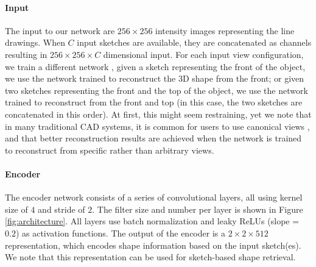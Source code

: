 \documentclass[10pt, conference, compsocconf]{IEEEtran}
\begin{document}
\vspace{-1mm}\paragraph{Input} The input to our network are $256 \times 256$ intensity images representing the line drawings. When $C$ input sketches are available, they are concatenated as channels resulting in $256 \times 256 \times C$ dimensional input. For each input view configuration, we train a different network \ie, given a sketch representing the front of the object, we use the network trained to reconstruct the 3D shape from the front; or given two sketches representing the front and the top of the object, we use the network trained to reconstruct from the front and top (in this case, the two sketches are concatenated in this order). At first, this might seem  restraining, yet we note that in many traditional CAD systems, it is common for users to use canonical views \cite{Rivers:2010:MS}, and that  better reconstruction results are achieved when the network is trained to reconstruct from specific rather than arbitrary views. 
\vspace{-1mm}\paragraph{Encoder} 
The encoder network consists of a series of convolutional layers, all using kernel size of $4$ and stride of $2$. The filter size and number per layer is shown in Figure \ref{fig:architecture}. All layers use batch normalization and leaky ReLUs (slope = $0.2$) as activation functions. The output of the encoder is a $2 \times 2 \times 512$ representation, which encodes shape information based on the input sketch(es). We note that this  representation  can be  used for sketch-based shape retrieval. 
\end{document}
